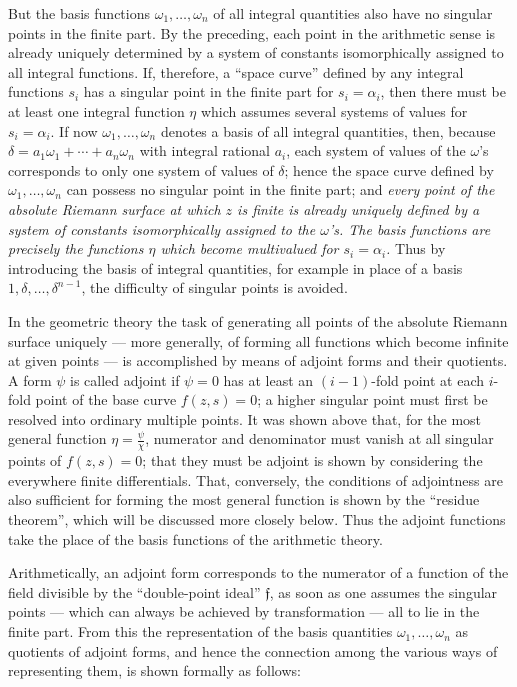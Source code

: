 \documentclass[11pt]{article}
\providecommand{\frf}{\mathfrak f}
\begin{document}
But the basis functions \(\omega_1,\ldots,\omega_n\) of all integral quantities also have no singular points in the finite part. By the preceding, each point in the arithmetic sense is already uniquely determined by a system of constants isomorphically assigned to all integral functions. If, therefore, a ``space curve'' defined by any integral functions \(s_i\) has a singular point in the finite part for \(s_i=\alpha_i\), then there must be at least one integral function \(\eta\) which assumes several systems of values for \(s_i=\alpha_i\). If now \(\omega_1,\ldots,\omega_n\) denotes a basis of all integral quantities, then, because \(\delta=a_1\omega_1+\cdots+a_n\omega_n\) with integral rational \(a_i\), each system of values of the \(\omega\)'s corresponds to only one system of values of \(\delta\); hence the space curve defined by \(\omega_1,\ldots,\omega_n\) can possess no singular point in the finite part; and \emph{every point of the absolute Riemann surface at which \(z\) is finite is already uniquely defined by a system of constants isomorphically assigned to the \(\omega\)'s. The basis functions are precisely the functions \(\eta\) which become multivalued for \(s_i=\alpha_i\).} Thus by introducing the basis of integral quantities, for example in place of a basis \(1,\delta,\ldots,\delta^{n-1}\), the difficulty of singular points is avoided.

In the geometric theory the task of generating all points of the absolute Riemann surface uniquely --- more generally, of forming all functions which become infinite at given points --- is accomplished by means of adjoint forms and their quotients. A form \(\psi\) is called adjoint if \(\psi=0\) has at least an \((i-1)\)-fold point at each \(i\)-fold point of the base curve \(f(z,s)=0\); a higher singular point must first be resolved into ordinary multiple points. It was shown above that, for the most general function \(\eta=\frac{\psi}{\chi}\), numerator and denominator must vanish at all singular points of \(f(z,s)=0\); that they must be adjoint is shown by considering the everywhere finite differentials. That, conversely, the conditions of adjointness are also sufficient for forming the most general function is shown by the ``residue theorem'', which will be discussed more closely below. Thus the adjoint functions take the place of the basis functions of the arithmetic theory.

Arithmetically, an adjoint form corresponds to the numerator of a function of the field divisible by the ``double-point ideal'' \(\frf\), as soon as one assumes the singular points --- which can always be achieved by transformation --- all to lie in the finite part. From this the representation of the basis quantities \(\omega_1,\ldots,\omega_n\) as quotients of adjoint forms, and hence the connection among the various ways of representing them, is shown formally as follows:
\end{document}
